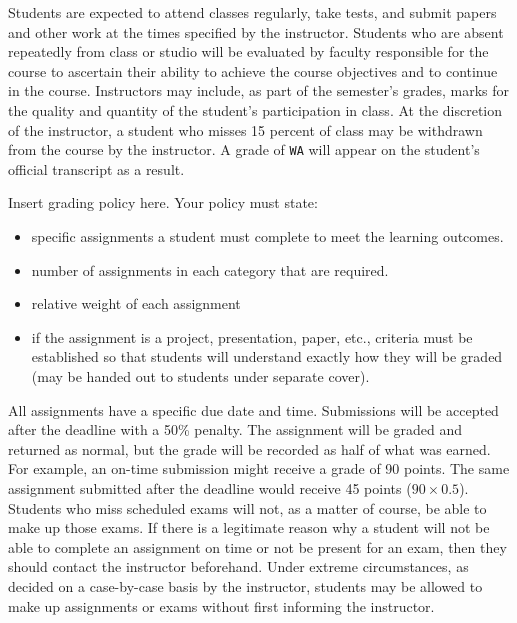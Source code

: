 \documentclass{wit_syllabus}
\begin{document}
Students are expected to attend classes regularly, take tests, and submit papers and other work at the times specified by the instructor. 
Students who are absent repeatedly from class or studio will be evaluated by faculty responsible for the course to ascertain their ability to achieve the course objectives and to continue in the course.  
Instructors may include, as part of the semester's grades, marks for the quality and quantity of the student's participation in class.  
At the discretion of the instructor, a student who misses 15 percent of class may be withdrawn from the course by the instructor. 
A grade of \texttt{WA} will appear on the student's official transcript as a result.

Insert grading policy here.  Your policy must state:
\begin{itemize}
\item specific assignments a student must complete to meet the learning outcomes.
\item number of assignments in each category that are required.
\item relative weight of each assignment
\item if the assignment is a project, presentation, paper, etc., criteria must be established so that students will understand exactly how they will be graded (may be handed out to students under separate cover).
\end{itemize}

\SyllabusGradingSystem

\SyllabusDropAdd


All assignments have a specific due date and time.  
Submissions will be accepted after the deadline with a 50\% penalty.  
The assignment will be graded and returned as normal, but the grade will be recorded as half of what was earned.  
For example, an on-time submission might receive a grade of 90 points.  
The same assignment submitted after the deadline would receive 45 points ($90 \times 0.5$).  
\\

Students who miss scheduled exams will not, as a matter of course, be able to make up those exams.  
If there is a legitimate reason why a student will not be able to complete an assignment on time or not be present for an exam, then they should contact the instructor beforehand.  
Under extreme circumstances, as decided on a case-by-case basis by the instructor, students may be allowed to make up assignments or exams without first informing the instructor.
\end{document}
